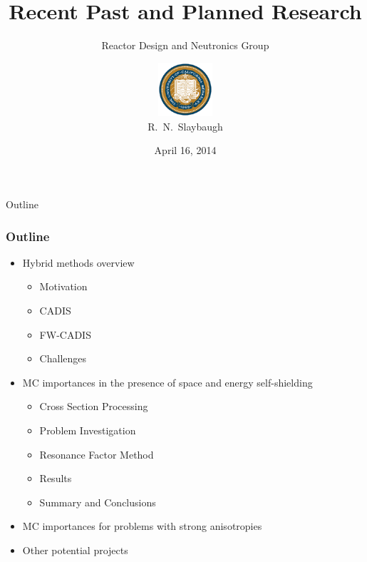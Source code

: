 \documentclass[xcolor=x11names,compress]{beamer}
\renewcommand{\(}{\begin{columns}}
\renewcommand{\)}{\end{columns}}
\newcommand{\<}[1]{\begin{column}{#1}}
\renewcommand{\>}{\end{column}}
\begin{document}
\begin{frame}
\title{Recent Past and Planned Research}
\subtitle{Reactor Design and Neutronics Group}
\author{
        \includegraphics[height=2cm]{../bk}\\R.\ N.\ Slaybaugh}

\date{April 16, 2014}
\titlepage
\end{frame}

\begin{frame}[fragile]{Outline}
  \frametitle{Outline}
  \begin{itemize}
    \item Hybrid methods overview
    \begin{itemize}
     	\item Motivation
		\item CADIS
		\item FW-CADIS
		\item Challenges
    \end{itemize}
	\item MC importances in the presence of space and energy self-shielding
	\begin{itemize}
    		\item Cross Section Processing
		\item Problem Investigation
		\item Resonance Factor Method
		\item Results
		\item Summary and Conclusions
  	\end{itemize}
	\item MC importances for problems with strong anisotropies
	\item Other potential projects
  \end{itemize}

\end{frame}


\end{document}
